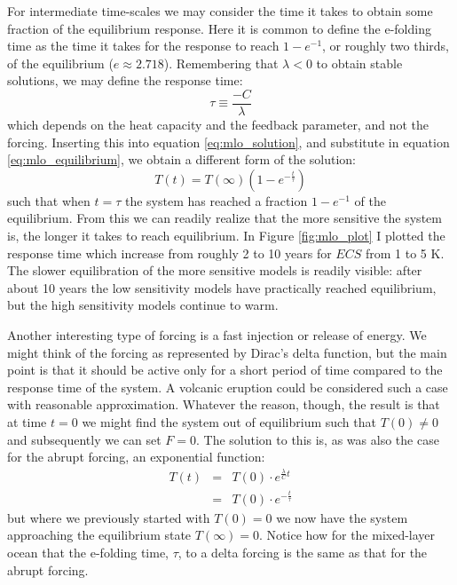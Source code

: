 \documentclass[12pt]{book}
\begin{document}
For intermediate time-scales we may consider the time it takes to obtain some fraction of the equilibrium response. Here it is common to define the e-folding time as the time it takes for the response to reach $1-e^{-1}$, or roughly two thirds, of the equilibrium ($e\approx 2.718$). Remembering that $\lambda<0$ to obtain stable solutions, we may define the response time:
$$\tau \equiv \frac{-C}{\lambda}$$
which depends on the heat capacity and the feedback parameter, and not the forcing. Inserting this into equation \ref{eq:mlo_solution}, and substitute in equation \ref{eq:mlo_equilibrium}, we obtain a different form of the solution:
$$T(t) = T(\infty)\left(1-e^{-\frac{t}{\tau}}\right)$$ 
such that when $t=\tau$ the system has reached a fraction $1-e^{-1}$ of the equilibrium. From this we can readily realize that the more sensitive the system is, the longer it takes to reach equilibrium. In Figure  \ref{fig:mlo_plot} I plotted the response time which increase from roughly 2 to 10 years for $ECS$ from 1 to 5 K. The slower equilibration of the more sensitive models is readily visible: after about 10 years the low sensitivity models have practically reached equilibrium, but the high sensitivity models continue to warm.

Another interesting type of forcing is a fast injection or release of energy. We might think of the forcing as represented by  Dirac's delta function, but the main point is that it should be active only for a short period of time compared to the response time of the system. A volcanic eruption could be considered such a case with reasonable approximation. Whatever the reason, though, the result is that at time $t=0$ we might find the system out of equilibrium such that $T(0) \ne 0$ and subsequently we can set $F=0$. The solution to this is, as was also the case for the abrupt forcing, an exponential function:
\begin{eqnarray}
T(t) &=& T(0)\cdot e^{\frac{\lambda}{C}t} \\
       &=& T(0)\cdot e^{-\frac{t}{\tau}} \nonumber
\end{eqnarray}
but where we previously started with $T(0)=0$ we now have the system approaching the equilibrium state $T(\infty)=0$. Notice how for the mixed-layer ocean that the e-folding time, $\tau$, to a delta forcing is the same as that for the abrupt forcing.


\end{document}
